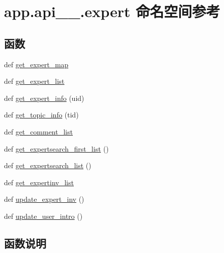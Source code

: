 \hypertarget{namespaceapp_1_1api__1__0_1_1expert}{}\section{app.\+api\+\_\+\_.\+expert 命名空间参考}
\label{namespaceapp_1_1api__1__0_1_1expert}
\subsection*{函数}
\begin{DoxyCompactItemize}
\item 
def \hyperlink{namespaceapp_1_1api__1__0_1_1expert_ad67d0db8aad4a90a70ad5af337076f99}{get\+\_\+expert\+\_\+map}
\item 
def \hyperlink{namespaceapp_1_1api__1__0_1_1expert_a2aef8e3a305172d5fc2ec7ebd4386c14}{get\+\_\+expert\+\_\+list}
\item 
def \hyperlink{namespaceapp_1_1api__1__0_1_1expert_aeb7e02e987f3951d72f2df8a8de62613}{get\+\_\+expert\+\_\+info} (uid)
\item 
def \hyperlink{namespaceapp_1_1api__1__0_1_1expert_acf792e35e5b48243540dbac094c1628c}{get\+\_\+topic\+\_\+info} (tid)
\item 
def \hyperlink{namespaceapp_1_1api__1__0_1_1expert_a90c29c044f8ce0bb1d8c550e73b9a143}{get\+\_\+comment\+\_\+list}
\item 
def \hyperlink{namespaceapp_1_1api__1__0_1_1expert_adbc903e06dc21ff52496dde9502a8d32}{get\+\_\+expertsearch\+\_\+first\+\_\+list} ()
\item 
def \hyperlink{namespaceapp_1_1api__1__0_1_1expert_a231f17add6f77504a34b2471ec0d89fc}{get\+\_\+expertsearch\+\_\+list} ()
\item 
def \hyperlink{namespaceapp_1_1api__1__0_1_1expert_ac5a2e095710d8463a6208c8fe679c0c3}{get\+\_\+expertinv\+\_\+list}
\item 
def \hyperlink{namespaceapp_1_1api__1__0_1_1expert_a6bcc721401e0183a61d6dca2ce7e5cd7}{update\+\_\+expert\+\_\+inv} ()
\item 
def \hyperlink{namespaceapp_1_1api__1__0_1_1expert_aba553c448587fe1245d73fb42bf47741}{update\+\_\+user\+\_\+intro} ()
\end{DoxyCompactItemize}


\subsection{函数说明}
\hypertarget{namespaceapp_1_1api__1__0_1_1expert_a90c29c044f8ce0bb1d8c550e73b9a143}{}
